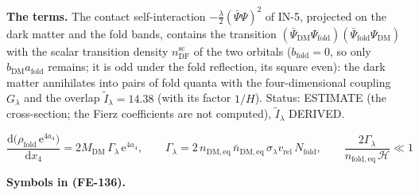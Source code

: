 \documentclass[
  10pt,
]{article}
\begin{document}
\textbf{The terms.} The contact self-interaction
\(-\frac{\lambda}{2}(\bar\Psi\Psi)^2\) of IN-5, projected on the dark
matter and the fold bands, contains the transition
\((\bar\Psi_{\mathrm{DM}}\Psi_{\mathrm{fold}})(\bar\Psi_{\mathrm{fold}}\Psi_{\mathrm{DM}})\)
with the scalar transition density \(n^{\mathrm{sc}}_{\mathrm{DF}}\) of
the two orbitals (\(b_{\mathrm{fold}} = 0\), so only
\(b_{\mathrm{DM}}a_{\mathrm{fold}}\) remains; it is odd under the fold
reflection, its square even): the dark matter annihilates into pairs of
fold quanta with the four-dimensional coupling \(G_\lambda\) and the
overlap \(\tilde I_\lambda = 14.38\) (with its factor \(1/H\)). Status:
ESTIMATE (the cross-section; the Fierz coefficients are not computed),
\(\tilde I_\lambda\) DERIVED.

\[
\frac{\mathrm{d}\big(\rho_{\mathrm{fold}}\,\mathrm{e}^{4a_4}\big)}{\mathrm{d}x_4} =
 2M_{\mathrm{DM}}\,\Gamma_\lambda\,\mathrm{e}^{4a_4},\qquad
\Gamma_\lambda = 2\,n_{\mathrm{DM,eq}}\,\bar n_{\mathrm{DM,eq}}\,\sigma_\lambda
 v_{\mathrm{rel}}\,N_{\mathrm{fold}},\qquad
\frac{2\Gamma_\lambda}{n_{\mathrm{fold,eq}}\,\mathcal{H}} \ll 1 \tag{FE-136}
\]

\textbf{Symbols in (FE-136).}
\end{document}
